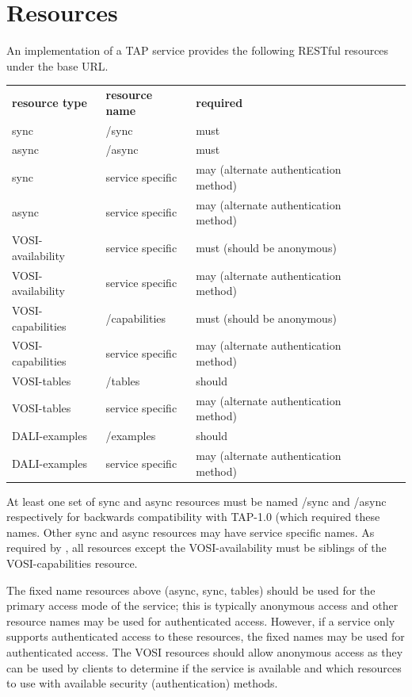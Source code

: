 \documentclass[11pt,letter]{ivoa}
\begin{document}
\section{Resources}
\label{sec:resources}

An implementation of a TAP service provides the following RESTful resources 
under the base URL.

\begin{tabular}{l l l l l}
\label{tab:resources}
\textbf{resource type} & \textbf{resource name} & \textbf{required} \\
{sync} & /sync & must & \\
{async} & /async & must & \\
{sync} & service specific & may (alternate authentication method) & \\
{async} & service specific & may (alternate authentication method) & \\
VOSI-availability & service specific & must (should be anonymous) & \\
VOSI-availability & service specific & may (alternate authentication method) & \\
VOSI-capabilities & /capabilities & must (should be anonymous) & \\
VOSI-capabilities & service specific & may (alternate authentication method) & \\
VOSI-tables & /tables & should & \\
VOSI-tables & service specific & may (alternate authentication method) & \\
DALI-examples & /examples & should & \\
DALI-examples & service specific & may (alternate authentication method) & \\
\end{tabular}

At least one set of {sync} and {async} resources must be named /sync and 
/async respectively for backwards compatibility with TAP-1.0 (which required 
these names. Other  {sync} and {async} resources may have service specific names. 
As required by \citep{std:DALI}, all resources except the VOSI-availability must 
be siblings of the VOSI-capabilities resource. 

The fixed name resources above (async, sync, tables) should be used for the 
primary access mode of the service; this is typically anonymous access and 
other resource names may be used for authenticated access. However, if a 
service only supports authenticated access to these resources, the fixed names 
may be used for authenticated access. The VOSI resources should allow anonymous 
access as they can be used by clients to determine if the service is available 
and which resources to use with available security (authentication) methods. 
\end{document}
